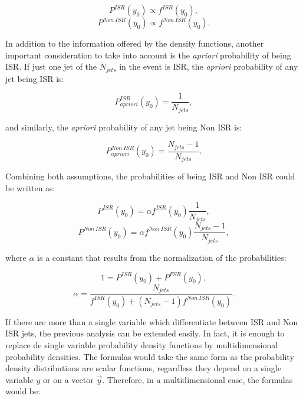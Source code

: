\documentclass[12pt, oneside]{book}              %
\begin{document}
\begin{equation} \label{eq:Prob_ISR_1}
P^{ISR}(y_0) \propto f^{ISR}(y_0),
\end{equation}
\begin{equation} \label{eq:Prob_Non_ISR_1}
P^{Non\ ISR}(y_0) \propto f^{Non\ ISR}(y_0).
\end{equation}

In addition to the information offered by the density functions, another important 
consideration to take into account is the \textit{apriori} probability of being ISR. If just one
jet of the $ N_{jets} $ in the event is ISR, the \textit{apriori} probability of any jet being ISR is:

\begin{equation} \label{eq:Prob_ISR_2}
P^{ISR}_{apriori}(y_0) = \frac{1}{N_{jets}},
\end{equation}

\noindent and similarly, the \textit{apriori} probability of any jet being Non ISR is:

\begin{equation} \label{eq:Prob_Non_ISR_2}
P^{Non\ ISR}_{apriori}(y_0) = \frac{N_{jets}-1}{N_{jets}}.
\end{equation}

Combining both assumptions, the probabilities of being ISR and Non ISR could be written as:

\begin{equation} \label{eq:Prob_ISR_3}
P^{ISR}(y_0) = \alpha f^{ISR}(y_0) \frac{1}{N_{jets}},
\end{equation}
\begin{equation} \label{eq:Prob_Non_ISR_3}
P^{Non\ ISR}(y_0) = \alpha f^{Non\ ISR}(y_0) \frac{N_{jets}-1}{N_{jets}},
\end{equation}

\noindent where $ \alpha $ is a constant that results from the normalization of the probabilities:

\begin{equation} \label{eq:Normalization}
1 = P^{ISR}(y_0) + P^{FSR}(y_0),
\end{equation}
\begin{equation} \label{eq:alpha}
\alpha = \dfrac{N_{jets}}{f^{ISR}(y_0)+(N_{jets}-1)f^{Non\ ISR}(y_0)}.
\end{equation}

If there are more than a single variable which differentiate between ISR and Non ISR jets, 
the previous analysis can be extended easily. In fact, it is enough to replace de single 
variable probability density functions by multidimensional probability densities. The formulas 
would take the same form as the probability density distributions are scalar functions, 
regardless they depend on a single variable $ y $ or on a vector $ \vec{y} $. Therefore, in 
a multidimensional case, the formulas would be:
\end{document}
